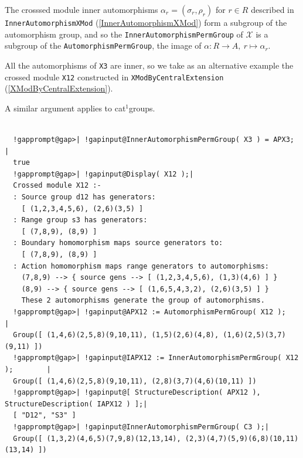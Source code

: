 \documentclass[a4paper,11pt]{report}
\newcommand{\calX}{\mathcal{X}}
\begin{document}
{{{ The crosssed module inner automorphisms $\alpha_r = (\sigma_r,\rho_r)$ for $r \in R$ described in \texttt{InnerAutomorphismXMod} (\ref{InnerAutomorphismXMod}) form a subgroup of the automorphism group, and so the \texttt{InnerAutomorphismPermGroup} of $\calX$ is a subgroup of the \texttt{AutomorphismPermGroup}, the image of $\alpha : R \to A,~ r \mapsto \alpha_r$. 

 All the automorphisms of \texttt{X3} are inner, so we take as an alternative example the crossed module \texttt{X12} constructed in \texttt{XModByCentralExtension} (\ref{XModByCentralExtension}). 

 A similar argument applies to cat$^1$\texttt{}groups. }

 

 
\begin{Verbatim}[commandchars=!@|,fontsize=\small,frame=single,label=Example]
  
  !gapprompt@gap>| !gapinput@InnerAutomorphismPermGroup( X3 ) = APX3;  |
  true
  !gapprompt@gap>| !gapinput@Display( X12 );|
  Crossed module X12 :- 
  : Source group d12 has generators:
    [ (1,2,3,4,5,6), (2,6)(3,5) ]
  : Range group s3 has generators:
    [ (7,8,9), (8,9) ]
  : Boundary homomorphism maps source generators to:
    [ (7,8,9), (8,9) ]
  : Action homomorphism maps range generators to automorphisms:
    (7,8,9) --> { source gens --> [ (1,2,3,4,5,6), (1,3)(4,6) ] }
    (8,9) --> { source gens --> [ (1,6,5,4,3,2), (2,6)(3,5) ] }
    These 2 automorphisms generate the group of automorphisms.
  !gapprompt@gap>| !gapinput@APX12 := AutomorphismPermGroup( X12 );     |
  Group([ (1,4,6)(2,5,8)(9,10,11), (1,5)(2,6)(4,8), (1,6)(2,5)(3,7)(9,11) ])
  !gapprompt@gap>| !gapinput@IAPX12 := InnerAutomorphismPermGroup( X12 );        |
  Group([ (1,4,6)(2,5,8)(9,10,11), (2,8)(3,7)(4,6)(10,11) ])
  !gapprompt@gap>| !gapinput@[ StructureDescription( APX12 ), StructureDescription( IAPX12 ) ];|
  [ "D12", "S3" ]
  !gapprompt@gap>| !gapinput@InnerAutomorphismPermGroup( C3 );|
  Group([ (1,3,2)(4,6,5)(7,9,8)(12,13,14), (2,3)(4,7)(5,9)(6,8)(10,11)(13,14) ])
  
  
\end{Verbatim}
 

}}
\end{document}
